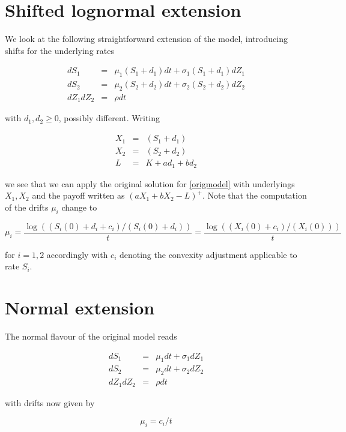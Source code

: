 \documentclass{amsart}
\theoremstyle{plain}
\numberwithin{equation}{section}
\begin{document}
\section{Shifted lognormal extension}

We look at the following straightforward extension of the model, introducing shifts for the underlying rates

\begin{eqnarray}
dS_1 &=& \mu_1 (S_1 + d_1) dt + \sigma_1 (S_1 + d_1) dZ_1 \\
dS_2 &=& \mu_2 (S_2 + d_2) dt + \sigma_2 (S_2 + d_2) dZ_2 \\
dZ_1 dZ_2 &=& \rho dt
\end{eqnarray}

with $d_1, d_2 \geq 0$, possibly different. Writing

\begin{eqnarray}
X_1 &=& (S_1 + d_1) \\
X_2 &=& (S_2 + d_2) \\
L &=& K + a d_1 + b d_2 
\end{eqnarray}

we see that we can apply the original solution for \ref{origmodel} with underlyings $X_1, X_2$ and the payoff written as $(aX_1+bX_2-L)^+$. Note that the computation of the drifts $\mu_i$ change to 

\begin{equation}
\mu_i = \frac{\log( (S_i(0)+d_i+c_i) / (S_i(0)+d_i) )}{t} = \frac{\log( (X_i(0)+c_i) / (X_i(0)) )}{t} 
\end{equation}

for $i=1,2$ accordingly with $c_i$ denoting the convexity adjustment applicable to rate $S_i$.

\section{Normal extension}

The normal flavour of the original model reads

\begin{eqnarray}
dS_1 &=& \mu_1 dt + \sigma_1 dZ_1 \\
dS_2 &=& \mu_2 dt + \sigma_2 dZ_2 \\
dZ_1 dZ_2 &=& \rho dt
\end{eqnarray}

with drifts now given by

\begin{equation}
\mu_i = c_i / t
\end{equation}
\end{document}
